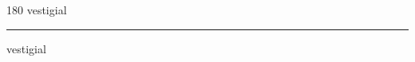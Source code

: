 
\begin{frame}
\begin{center}
\begin{turn}{180}
{\fontsize{2.5cm}{1em}\selectfont vestigial}
\end{turn}
\vspace{1em}\par  
\hrule
\vspace{1em}\par  
{\fontsize{2.5cm}{1em}\selectfont vestigial}
\end{center}
\end{frame}
